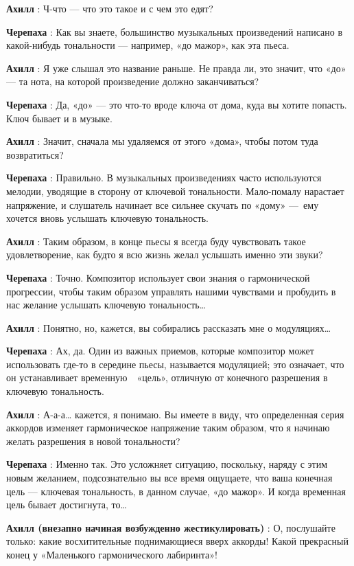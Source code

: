 \textbf{Ахилл} : Ч-что --- что это такое и с чем это едят?

\textbf{Черепаха} : Как вы знаете, большинство музыкальных произведений написано в какой-нибудь тональности --- например, «до мажор», как эта пьеса.

\textbf{Ахилл} : Я уже слышал это название раньше. Не правда ли, это значит, что «до» --- та нота, на которой произведение должно заканчиваться?

\textbf{Черепаха} : Да, «до» --- это что-то вроде ключа от дома, куда вы хотите попасть. Ключ бывает и в музыке.

\textbf{Ахилл} : Значит, сначала мы удаляемся от этого «дома», чтобы потом туда возвратиться?

\textbf{Черепаха} : Правильно. В музыкальных произведениях часто используются мелодии, уводящие в сторону от ключевой тональности. Мало-помалу нарастает напряжение, и слушатель начинает все сильнее скучать по «дому» ---~ему хочется вновь услышать ключевую тональность.

\textbf{Ахилл} : Таким образом, в конце пьесы я всегда буду чувствовать такое удовлетворение, как будто я всю жизнь желал услышать именно эти звуки?

\textbf{Черепаха} : Точно. Композитор использует свои знания о гармонической прогрессии, чтобы таким образом управлять нашими чувствами и пробудить в нас желание услышать ключевую тональность\ldots{}

\textbf{Ахилл} : Понятно, но, кажется, вы собирались рассказать мне о модуляциях\ldots{}

\textbf{Черепаха} : Ах, да. Один из важных приемов, которые композитор может использовать где-то в середине пьесы, называется модуляцией; это означает, что он устанавливает временную~~«цель», отличную от конечного разрешения в ключевую тональность.

\textbf{Ахилл} : А-а-а\ldots{} кажется, я понимаю. Вы имеете в виду, что определенная серия аккордов изменяет гармоническое напряжение таким образом, что я начинаю желать разрешения в новой тональности?

\textbf{Черепаха} : Именно так. Это усложняет ситуацию, поскольку, наряду с этим новым желанием, подсознательно вы все время ощущаете, что ваша конечная цель --- ключевая тональность, в данном случае, «до мажор». И когда временная цель бывает достигнута, то\ldots{}

\textbf{Ахилл (внезапно начиная возбужденно жестикулировать)} : О, послушайте только: какие восхитительные поднимающиеся вверх аккорды! Какой прекрасный конец у «Маленького гармонического лабиринта»!


